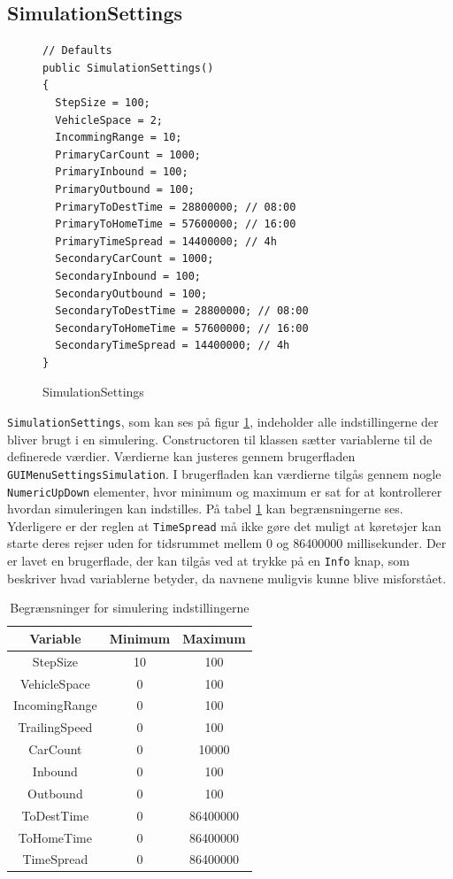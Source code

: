 \subsection{SimulationSettings}
\begin{figure}[H]
\begin{lstlisting} 
// Defaults
public SimulationSettings()
{
  StepSize = 100;
  VehicleSpace = 2;
  IncommingRange = 10;
  PrimaryCarCount = 1000;
  PrimaryInbound = 100;
  PrimaryOutbound = 100;
  PrimaryToDestTime = 28800000; // 08:00
  PrimaryToHomeTime = 57600000; // 16:00
  PrimaryTimeSpread = 14400000; // 4h
  SecondaryCarCount = 1000;
  SecondaryInbound = 100;
  SecondaryOutbound = 100;
  SecondaryToDestTime = 28800000; // 08:00
  SecondaryToHomeTime = 57600000; // 16:00
  SecondaryTimeSpread = 14400000; // 4h
}
\end{lstlisting}
\caption{SimulationSettings}\label{SimulationSettings}
\end{figure}

\texttt{SimulationSettings}, som kan ses på figur \ref{SimulationSettings}, indeholder alle indstillingerne der bliver brugt i en simulering. Constructoren til klassen sætter variablerne til de definerede værdier. Værdierne kan justeres gennem brugerfladen \newline \texttt{GUIMenuSettingsSimulation}. I brugerfladen kan værdierne tilgås gennem nogle \texttt{NumericUpDown} elementer, hvor minimum og maximum er sat for at kontrollerer hvordan simuleringen kan indstilles. På tabel \ref{SimulationLimits} kan begrænsningerne ses. Yderligere er der reglen at \texttt{TimeSpread} må ikke gøre det muligt at køretøjer kan starte deres rejser uden for tidsrummet mellem 0 og 86400000 millisekunder. Der er lavet en brugerflade, der kan tilgås ved at trykke på en \texttt{Info} knap, som beskriver hvad variablerne betyder, da navnene muligvis kunne blive misforstået.

\begin{table}[H]
\centering
\begin{tabular}{| c | c | c |}
  \hline
Variable & Minimum & Maximum \\
  \hline
StepSize & 10 & 100 \\
  \hline
VehicleSpace & 0 & 100 \\
  \hline
IncomingRange & 0 & 100 \\
  \hline
TrailingSpeed & 0 & 100 \\
  \hline
CarCount & 0 & 10000 \\
  \hline
Inbound & 0 & 100 \\
  \hline
Outbound & 0 & 100 \\
  \hline
ToDestTime & 0 & 86400000 \\
  \hline
ToHomeTime & 0 & 86400000 \\
  \hline
TimeSpread & 0 & 86400000 \\
  \hline
\end{tabular}
\caption{Begrænsninger for simulering indstillingerne}\label{SimulationLimits}
\end{table}

